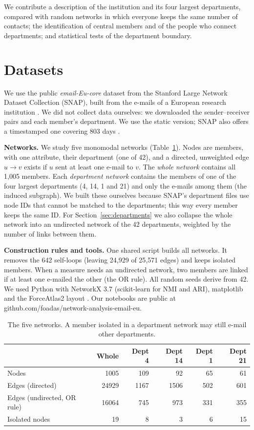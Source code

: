\documentclass[12pt, a4paper]{article}
\begin{document}
We contribute a description of the institution and its four largest
departments, compared with random networks in which everyone keeps the same
number of contacts; the identification of central members and of the people
who connect departments; and statistical tests of the department boundary.

\section{Datasets}
\label{datasets}

We use the public \emph{email-Eu-core} dataset from the Stanford Large Network
Dataset Collection (SNAP), built from the e-mails of a European research
institution \cite{leskovec2007,yin2017}. We did not collect data ourselves: we
downloaded the sender--receiver pairs and each member's department. We use the
static version; SNAP also offers a timestamped one covering 803 days
\cite{paranjape2017}.

\textbf{Networks.} We study five monomodal networks
(Table~\ref{tab:datasets}). Nodes are members, with one attribute, their
department (one of 42), and a directed, unweighted edge $u \rightarrow v$
exists if $u$ sent at least one e-mail to $v$. The \emph{whole network}
contains all 1{,}005 members. Each \emph{department network} contains the
members of one of the four largest departments (4, 14, 1 and 21) and only the
e-mails among them (the induced subgraph). We built these ourselves because
SNAP's department files use node IDs that cannot be matched to the
departments; this way every member keeps the same ID. For
Section~\ref{sec:departments} we also collapse the whole network into an
undirected network of the 42 departments, weighted by the number of links
between them.

\textbf{Construction rules and tools.} One shared script builds all networks.
It removes the 642 self-loops (leaving 24{,}929 of 25{,}571 edges) and keeps
isolated members. When a measure needs an undirected network, two members are
linked if at least one e-mailed the other (the OR rule). All random seeds
derive from 42. We used Python with NetworkX 3.7 (scikit-learn for NMI and
ARI), matplotlib and the ForceAtlas2 layout \cite{jacomy2014}. Our notebooks
are public at github.com/foadas/network-analysis-email-eu.

\begin{table}[htbp]
\centering
\small
\begin{tabular}{lrrrrr}
\toprule
 & Whole & Dept 4 & Dept 14 & Dept 1 & Dept 21 \\
\midrule
Nodes                        & 1005  & 109  & 92   & 65   & 61   \\
Edges (directed)             & 24929 & 1167 & 1506 & 502  & 601  \\
Edges (undirected, OR rule)  & 16064 & 745  & 973  & 331  & 355  \\
Isolated nodes               & 19    & 8    & 3    & 6    & 15   \\
\bottomrule
\end{tabular}
\caption{The five networks. A member isolated in a department network may
still e-mail other departments.}
\label{tab:datasets}
\end{table}
\end{document}
